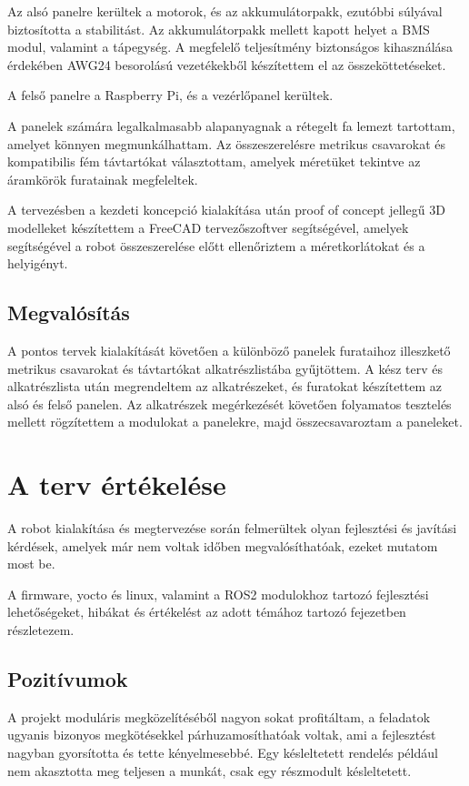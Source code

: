 Az alsó panelre kerültek a motorok, és az akkumulátorpakk, ezutóbbi súlyával
biztosította a stabilitást. Az akkumulátorpakk mellett kapott helyet a BMS modul,
valamint a tápegység. A megfelelő teljesítmény biztonságos kihasználása érdekében
AWG24 besorolású vezetékekből készítettem el az összeköttetéseket.

A felső panelre a Raspberry Pi, és a vezérlőpanel kerültek.

A panelek számára legalkalmasabb alapanyagnak a rétegelt fa lemezt tartottam,
amelyet könnyen megmunkálhattam. Az összeszerelésre metrikus csavarokat és
kompatibilis fém távtartókat választottam, amelyek méretüket tekintve az
áramkörök furatainak megfeleltek.

A tervezésben a kezdeti koncepció kialakítása után proof of concept jellegű 
3D modelleket készítettem a FreeCAD tervezőszoftver segítségével, amelyek
segítségével a robot összeszerelése előtt ellenőriztem a méretkorlátokat és a
helyigényt.

\subsection{Megvalósítás}

A pontos tervek kialakítását követően a különböző panelek furataihoz illeszkető
metrikus csavarokat és távtartókat alkatrészlistába gyűjtöttem. A kész terv és
alkatrészlista után megrendeltem az alkatrészeket, és furatokat készítettem az
alsó és felső panelen. Az alkatrészek megérkezését követően folyamatos tesztelés
mellett rögzítettem a modulokat a panelekre, majd összecsavaroztam a paneleket.


\section{A terv értékelése}

A robot kialakítása és megtervezése során felmerültek olyan fejlesztési és
javítási kérdések, amelyek már nem voltak időben megvalósíthatóak, ezeket mutatom
most be.

A firmware, yocto és linux, valamint a ROS2 modulokhoz tartozó fejlesztési
lehetőségeket, hibákat és értékelést az adott témához tartozó fejezetben
részletezem.

\subsection{Pozitívumok}

A projekt moduláris megközelítéséből nagyon sokat profitáltam, a feladatok
ugyanis bizonyos megkötésekkel párhuzamosíthatóak voltak, ami a fejlesztést
nagyban gyorsította és tette kényelmesebbé. Egy késleltetett rendelés például nem
akasztotta meg teljesen a munkát, csak egy részmodult késleltetett.

